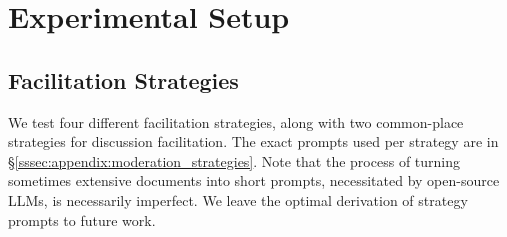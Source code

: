 \section{Experimental Setup}
\label{sec:experimental}

\subsection{Facilitation Strategies}
\label{ssec:experimental:strategies}

We test four different facilitation strategies, along with two common-place strategies for discussion facilitation. The exact prompts used per strategy are in \S\ref{sssec:appendix:moderation_strategies}. Note that the process of turning sometimes extensive documents into short prompts, necessitated by open-source \acp{LLM}, is necessarily imperfect. We leave the optimal derivation of strategy prompts to future work.

